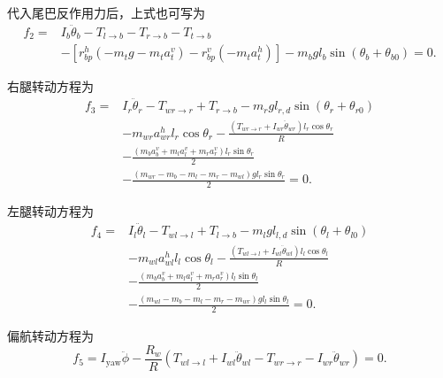\documentclass[UTF8,a4paper,12pt]{ctexart}
\begin{document}
代入尾巴反作用力后，上式也可写为
\begin{equation}
\begin{aligned}
    f_2
    ={}&
    I_b\ddot\theta_b
    - T_{l\to b}
    - T_{r\to b}
    - T_{t\to b} \\
    &-
    \left[
        r_{bp}^h(-m_t g-m_t a_t^v)
        -
        r_{bp}^v(-m_t a_t^h)
    \right]
    -
    m_b g l_b \sin(\theta_b+\theta_{b0})
    =0 .
\end{aligned}
\end{equation}

右腿转动方程为
\begin{equation}
\begin{aligned}
    f_3
    ={}&
    I_r\ddot\theta_r
    - T_{wr\to r}
    + T_{r\to b}
    - m_r g l_{r,d}\sin(\theta_r+\theta_{r0}) \\
    &-
    m_{wr} a_{wr}^h l_r\cos\theta_r
    -
    \frac{
        (T_{wr\to r}+I_{wr}\ddot\theta_{wr})
        l_r\cos\theta_r
    }{R} \\
    &-
    \frac{
        (m_b a_b^v + m_l a_l^v + m_r a_r^v)
        l_r\sin\theta_r
    }{2} \\
    &-
    \frac{
        (m_{wr}-m_b-m_l-m_r-m_{wl})
        g l_r\sin\theta_r
    }{2}
    =0 .
\end{aligned}
\end{equation}

左腿转动方程为
\begin{equation}
\begin{aligned}
    f_4
    ={}&
    I_l\ddot\theta_l
    - T_{wl\to l}
    + T_{l\to b}
    - m_l g l_{l,d}\sin(\theta_l+\theta_{l0}) \\
    &-
    m_{wl} a_{wl}^h l_l\cos\theta_l
    -
    \frac{
        (T_{wl\to l}+I_{wl}\ddot\theta_{wl})
        l_l\cos\theta_l
    }{R} \\
    &-
    \frac{
        (m_b a_b^v + m_l a_l^v + m_r a_r^v)
        l_l\sin\theta_l
    }{2} \\
    &-
    \frac{
        (m_{wl}-m_b-m_l-m_r-m_{wr})
        g l_l\sin\theta_l
    }{2}
    =0 .
\end{aligned}
\end{equation}

偏航转动方程为
\begin{equation}
    f_5
    =
    I_{\mathrm{yaw}}\ddot\phi
    -
    \frac{R_w}{R}
    \left(
        T_{wl\to l}
        + I_{wl}\ddot\theta_{wl}
        - T_{wr\to r}
        - I_{wr}\ddot\theta_{wr}
    \right)
    =0 .
\end{equation}
\end{document}
